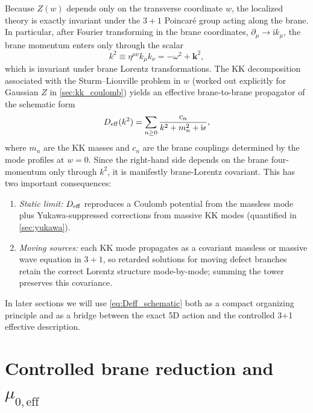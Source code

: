 \documentclass[11pt]{article}
\newcommand{\ii}{\mathrm i}
\newcommand{\Z}{Z}
\begin{document}
Because \(\Z(w)\) depends only on the transverse coordinate \(w\), the localized
theory is exactly invariant under the \(3+1\) Poincar\'e group acting along the
brane. In particular, after Fourier transforming in the brane coordinates,
\(\partial_\mu \to \ii k_\mu\), the brane momentum enters only through the scalar
\begin{equation}
  k^2 \equiv \eta^{\mu\nu}k_\mu k_\nu = -\omega^2 + \mathbf{k}^2,
\end{equation}
which is invariant under brane Lorentz transformations. The KK decomposition
associated with the Sturm--Liouville problem in \(w\) (worked out explicitly for
Gaussian \(\Z\) in \cref{sec:kk_coulomb}) yields an effective brane-to-brane
propagator of the schematic form
\begin{equation}
  D_{\rm eff}(k^2)
  = \sum_{n\ge 0}\frac{c_n}{k^2 + m_n^2 + \ii\epsilon},
  \label{eq:Deff_schematic}
\end{equation}
where \(m_n\) are the KK masses and \(c_n\) are the brane couplings determined by
the mode profiles at \(w=0\). Since the right-hand side depends on the brane
four-momentum only through \(k^2\), it is manifestly brane-Lorentz covariant.
This has two important consequences:

\begin{enumerate}
\item \emph{Static limit:} \(D_{\rm eff}\) reproduces a Coulomb potential from the
massless mode plus Yukawa-suppressed corrections from massive KK modes (quantified
in \cref{sec:yukawa}).

\item \emph{Moving sources:} each KK mode propagates as a covariant massless or
massive wave equation in \(3+1\), so retarded solutions for moving defect
branches retain the correct Lorentz structure mode-by-mode; summing the tower
preserves this covariance.
\end{enumerate}

In later sections we will use \cref{eq:Deff_schematic} both as a compact
organizing principle and as a bridge between the exact 5D action and the
controlled 3+1 effective description.

\section{Controlled brane reduction and \texorpdfstring{$\mu_{0,\mathrm{eff}}$}{mu0,eff}}
\label{sec:brane_reduction}
\end{document}
